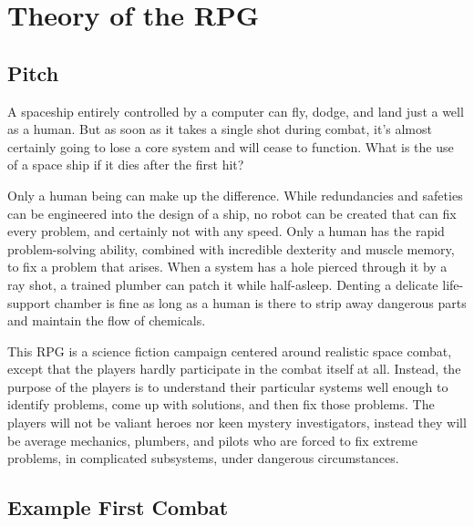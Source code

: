 \documentclass[a4paper]{article}
\begin{document}
\section{Theory of the RPG} \label{theory}

\subsection{Pitch}

A spaceship entirely controlled by a computer can fly, dodge, and land just a well as a human. But as soon as it takes a single shot during combat, it's almost certainly going to lose a core system and will cease to function. What is the use of a space ship if it dies after the first hit?

Only a human being can make up the difference. While redundancies and safeties can be engineered into the design of a ship, no robot can be created that can fix every problem, and certainly not with any speed. Only a human has the rapid problem-solving ability, combined with incredible dexterity and muscle memory, to fix a problem that arises. When a system has a hole pierced through it by a ray shot, a trained plumber can patch it while half-asleep. Denting a delicate life-support chamber is fine as long as a human is there to strip away dangerous parts and maintain the flow of chemicals.

This RPG is a science fiction campaign centered around realistic space combat, except that the players hardly participate in the combat itself at all. Instead, the purpose of the players is to understand their particular systems well enough to identify problems, come up with solutions, and then fix those problems. The players will not be valiant heroes nor keen mystery investigators, instead they will be average mechanics, plumbers, and pilots who are forced to fix extreme problems, in complicated subsystems, under dangerous circumstances. 

\subsection{Example First Combat} \label{example_first_combat}
\end{document}
